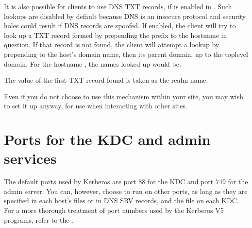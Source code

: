 \documentclass[letterpaper,10pt,english]{sphinxmanual}
\begin{document}
\sphinxAtStartPar
It is also possible for clients to use DNS TXT records, if
 is enabled in {\hyperref[\detokenize{admin/conf_files/krb5_conf:krb5-conf-5}]{}}.  Such lookups
are disabled by default because DNS is an insecure protocol and security
holes could result if DNS records are spoofed.  If enabled, the client
will try to look up a TXT record formed by prepending the prefix
 to the hostname in question.  If that record is not
found, the client will attempt a lookup by prepending  to the
host’s domain name, then its parent domain, up to the top\sphinxhyphen{}level domain.
For the hostname , the names looked up
would be:

\begin{sphinxVerbatim}[commandchars=\\\{\}]
\end{sphinxVerbatim}

\sphinxAtStartPar
The value of the first TXT record found is taken as the realm name.

\sphinxAtStartPar
Even if you do not choose to use this mechanism within your site,
you may wish to set it up anyway, for use when interacting with other sites.


\section{Ports for the KDC and admin services}
\label{\detokenize{admin/realm_config:ports-for-the-kdc-and-admin-services}}
\sphinxAtStartPar
The default ports used by Kerberos are port 88 for the KDC and port
749 for the admin server.  You can, however, choose to run on other
ports, as long as they are specified in each host’s
{\hyperref[\detokenize{admin/conf_files/krb5_conf:krb5-conf-5}]{}} files or in DNS SRV records, and the
{\hyperref[\detokenize{admin/conf_files/kdc_conf:kdc-conf-5}]{}} file on each KDC.  For a more thorough treatment of
port numbers used by the Kerberos V5 programs, refer to the
{\hyperref[\detokenize{admin/appl_servers:conf-firewall}]{}}.
\end{document}
